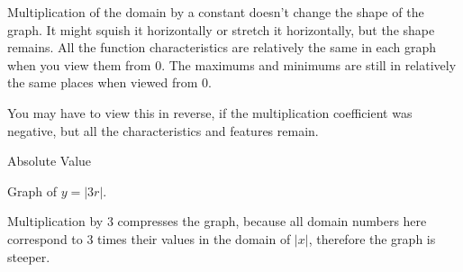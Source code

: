 \documentclass{ximera}
\begin{document}
Multiplication of the domain by a constant doesn't change the shape of the graph.  It might squish it horizontally or stretch it horizontally, but the shape remains.  All the function characteristics are relatively the same in each graph when you view them from $0$. The maximums and minimums are still in relatively the same places when viewed from $0$.  

You may have to view this in reverse, if the multiplication coefficient was negative, but all the characteristics and features remain.








\begin{example} Absolute Value



Graph of $y = |3r|$.



\begin{image}
\end{image}



Multiplication by $3$ compresses the graph, because all domain numbers here correspond to $3$ times their values in the domain of $|x|$, therefore the graph is steeper.






\end{example}
\end{document}
